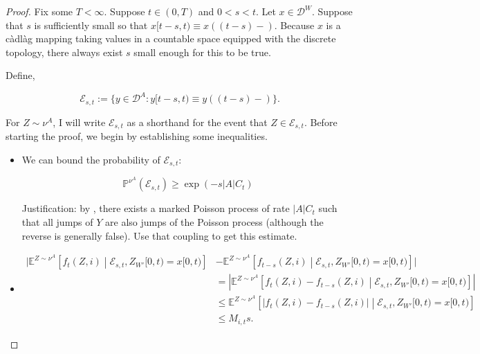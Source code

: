 \documentclass[12pt]{article}
\newcommand{\mb}{\mathbb}
\newcommand{\mc}{\mathcal}
\newcommand{\ind}{\hspace{24pt}}
\newcommand{\pr}{\mb{P}}							%
\newcommand{\exmu}[2]{\mb{E}^{#1}\left[#2\right]}	%
\newcommand{\defeq}{:=}								%
\newcommand{\cad}{\mc{D}}							%
\newcommand{\xf}{x}									%
\newcommand{\xg}{y}									%
\newcommand{\vind}[1]{_{#1}}						%
\newcommand{\tme}[1]{(#1)}							%
\newcommand{\tmi}[1]{#1}							%
\newcommand{\vpara}[1]{^{#1}}						%
\newcommand{\tpara}[1]{_{#1}}						%
\newcommand{\jumpbd}[1]{C_{#1}}						%
\newcommand{\evnt}{\mc{E}}						%
\newcommand{\Xg}{Y}									%
\newcommand{\mm}{\nu}								%
\newcommand{\const}{M}								%
\newcommand{\sttpara}[2]{_{#1,#2}}					%
\newcommand{\mpara}[1]{^{#1}}						%
\newcommand{\tspara}[2]{_{#1,#2}}					%
\newcommand{\Xh}{Z}									%
\begin{document}
\begin{proof}
Fix some \(T < \infty\). Suppose \(t \in (0,T)\) and \(0 < s < t\). Let \(x \in \cad\vpara{W}\). Suppose that \(s\) is sufficiently small so that \(\xf\tmi{[t-s,t)} \equiv \xf\tme{(t-s)-}\). Because \(\xf\) is a c\`adl\`ag mapping taking values in a countable space equipped with the discrete topology, there always exist \(s\) small enough for this to be true.

\ind Define,

\[\evnt\tspara{s}{t} \defeq \{\xg \in \cad\vpara{A}: \xg\tmi{[t-s,t)} \equiv \xg\tme{(t-s)-}\}.\]

For \(Z \sim \mm\vpara{A}\), I will write \(\evnt\tspara{s}{t}\) as a shorthand for the event that \(Z \in \evnt\tspara{s}{t}\). Before starting the proof, we begin by establishing some inequalities.

\begin{itemize}
\item We can bound the probability of \(\evnt\tspara{s}{t}\):

\begin{equation}
\pr\mpara{\mm\vpara{A}}(\evnt\tspara{s}{t}) \geq \exp\left(-s|A|\jumpbd{t}\right)
\label{Ex::evntbd}
\end{equation}

Justification: by \cite[Exercise 14.7.I]{DalVer08}, there exists a marked Poisson process of rate \(|A|\jumpbd{t}\) such that all jumps of \(\Xg\) are also jumps of the Poisson process (although the reverse is generally false). Use that coupling to get this estimate.

\item 

\begin{align}
\big|\exmu{\Xh \sim\mm\vpara{A}}{f\tpara{t}(\Xh,i)\middle|\evnt\tspara{s}{t},\Xh\vind{W'}\tmi{[0,t)} = \xf\tmi{[0,t)}}& - \exmu{\Xh \sim\mm\vpara{A}}{f\tpara{t-s}(\Xh,i)\middle|\evnt\tspara{s}{t},\Xh\vind{W'}\tmi{[0,t)} = \xf\tmi{[0,t)}}\big|\nonumber \\
&= \left|\exmu{\Xh \sim\mm\vpara{A}}{f\tpara{t}(\Xh,i) - f\tpara{t-s}(\Xh,i)\middle|\evnt\tspara{s}{t},\Xh\vind{W'}\tmi{[0,t)} = \xf\tmi{[0,t)}}\right|\nonumber\\
& \leq \exmu{\Xh \sim\mm\vpara{A}}{|f\tpara{t}(\Xh,i) - f\tpara{t-s}(\Xh,i)|\middle|\evnt\tspara{s}{t},\Xh\vind{W'}\tmi{[0,t)} = \xf\tmi{[0,t)}}\nonumber\\
&\leq \const\sttpara{i}{t}s.
\label{Ex::lipft}
\end{align}


\end{itemize}
\end{proof}
\end{document}
